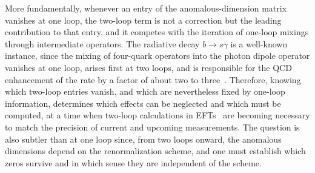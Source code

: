 More fundamentally, whenever an entry of the anomalous-dimension matrix vanishes at one loop, the
two-loop term is not a correction but the leading contribution to that entry,
and it competes with the iteration of one-loop mixings through intermediate operators. 
The radiative decay $b\to s\gamma$ is a well-known instance, since the mixing of four-quark operators into the photon dipole operator vanishes at one loop, arises first at two loops, and is responsible for the QCD enhancement of the rate by a factor of about two to three~\cite{Grinstein:1987vj,Misiak:1992bc,Ciuchini:1993ks,Buchalla:1995vs}.
Therefore, knowing
which two-loop entries vanish, and which are nevertheless fixed by one-loop information, determines
which effects can be neglected and which must be computed, at a time when two-loop calculations in
EFTs~\cite{Aebischer:2022anv,Jenkins:2023bls,Jenkins:2023rtg,Born:2024mgz,DiNoi:2024ajj,Fuentes-Martin:2024agf,Naterop:2024cfx,Ibarra:2024tpt,Guedes:2025sax,Duhr:2025zqw,Duhr:2025yor,Naterop:2025lzc,Naterop:2025cwg,DiNoi:2025tka,DiNoi:2025arz,Banik:2025wpi,Aebischer:2025hsx,Zhang:2025ywe,Aebischer:2026zxv,Born:2026xkr} are becoming necessary to match the precision of current and upcoming measurements.
The question is also subtler than at one loop since, from two loops onward, the anomalous dimensions depend on the renormalization scheme, and one must establish which zeros survive and in which sense they are independent of the scheme.

